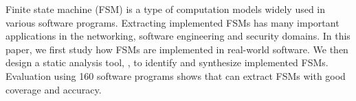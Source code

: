 Finite state machine (FSM) is a type of computation models widely
used in various software programs.
Extracting implemented FSMs has many important applications in the
networking, software engineering and security domains.
In this paper, we first study how FSMs are implemented in real-world software.
We then design a static analysis tool, \Tool{}, to identify and synthesize
implemented FSMs.
Evaluation using 160 software programs shows that
\Tool{} can extract FSMs with good coverage and accuracy.
